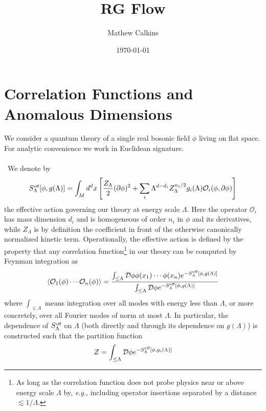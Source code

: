 \documentclass[11pt,letterpaper]{article}
\newcommand{\mc}[1]{\mathcal{#1}}
\newcommand{\D}{\partial}
\begin{document}
\title{RG Flow}

\author{Mathew Calkins}

\date{\today}

 
\maketitle


\tableofcontents


\section{Correlation Functions and Anomalous Dimensions}
We consider a quantum theory of a single real bosonic field $\phi$ living on flat space. For analytic convenience we work in Euclidean signature.\\
\\
\
We denote by \begin{equation}
S_\Lambda^{\mbox{\tiny{eff}}}[\phi, g(\Lambda)] = \int_M d^d x \left[ \frac{Z_\Lambda}{2} (\D \phi)^2 + \sum_i \Lambda^{d - d_i} Z_\Lambda^{n_i / 2} g_i (\Lambda) \mc{O}_i( \phi, \D \phi) \right]
\end{equation} the effective action governing our theory at energy scale $\Lambda$. Here the operator $\mc{O}_i$ has mass dimension $d_i$ and is homogeneous of order $n_i$ in $\phi$ and its derivatives, while $Z_\Lambda$ is by definition the coefficient in front of the otherwise canonically normalized kinetic term. Operationally, the effective action is defined by the property that any correlation function\footnote{As long as the correlation function does not probe physics near or above energy scale $\Lambda$ by, \textit{e.g.}, including operator insertions separated by a distance $\lesssim 1 / \Lambda$.} in our theory can be computed by Feynman integration as \begin{equation}
\langle \mc{O}_1(\phi) \cdots \mc{O}_n (\phi) \rangle = \frac{\int_{\leq \Lambda} \mc{D} \phi \phi(x_1) \cdots \phi(x_n) e^{- S_\Lambda^{\mbox{\tiny{eff}}}[\phi, g(\Lambda)]}}{\int_{\leq \Lambda} \mc{D} \phi e^{- S_\Lambda^{\mbox{\tiny{eff}}}[\phi, g(\Lambda)]}}
\end{equation} 
where $\int_{\leq \Lambda}$ means integration over all modes with energy less than $\Lambda$, or more concretely, over all Fourier modes of norm at most $\Lambda$. In particular, the dependence of $S_\Lambda^{\mbox{\tiny{eff}}}$ on $\Lambda$ (both directly and through its dependence on $g(\Lambda)$) is constructed such that the partition function \begin{equation}
\mc{Z} = \int_{\leq \Lambda} \mc{D} \phi e^{- S_\Lambda^{\mbox{\tiny{eff}}}[\phi, g_i(\Lambda)]}
\end{equation}
\end{document}
